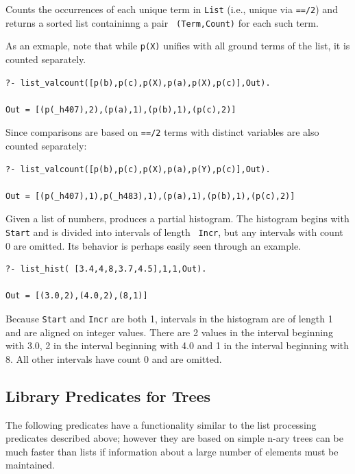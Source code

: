 \begin{description}
%
Counts the occurrences of each unique term in {\tt List} (i.e., unique
via {\tt ==/2}) and returns a sorted list containinng a pair {\tt
  (Term,Count)} for each such term.

As an exmaple, note that while {\tt p(X)} unifies with all ground terms
of the list, it is counted separately.
\begin{verbatim}
?- list_valcount([p(b),p(c),p(X),p(a),p(X),p(c)],Out).

Out = [(p(_h407),2),(p(a),1),(p(b),1),(p(c),2)]
\end{verbatim}

Since comparisons are based on {\tt ==/2} terms with distinct
variables are also counted separately: 
\begin{verbatim}
?- list_valcount([p(b),p(c),p(X),p(a),p(Y),p(c)],Out).

Out = [(p(_h407),1),p(_h483),1),(p(a),1),(p(b),1),(p(c),2)]
\end{verbatim}

%
Given a list of numbers, produces a partial histogram.  The histogram
begins with {\tt Start} and is divided into intervals of length {\tt
  Incr}, but any intervals with count 0 are omitted.  Its behavior is
perhaps easily seen through an example.
\begin{verbatim}
?- list_hist( [3.4,4,8,3.7,4.5],1,1,Out).

Out = [(3.0,2),(4.0,2),(8,1)]
\end{verbatim}
Because {\tt Start} and {\tt Incr} are both 1, intervals in the
histogram are of length 1 and are aligned on integer values.  There
are 2 values in the interval beginning with 3.0, 2 in the interval
beginning with 4.0 and 1 in the interval beginning with 8.  All other
intervals have count 0 and are omitted.
    
\end{description}

\subsection{Library Predicates for Trees}

The following predicates have a functionality similar to the list
processing predicates described above; however they are based on
simple n-ary trees can be much faster than lists if information about
a large number of elements must be maintained.

